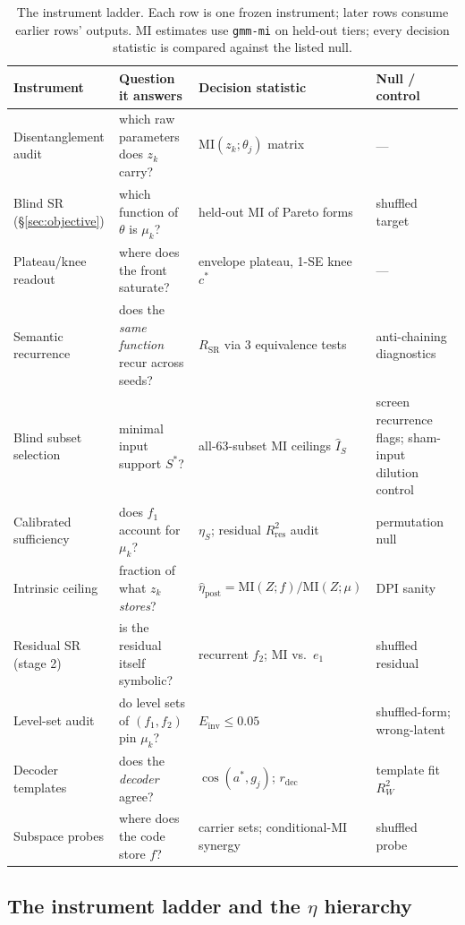 \documentclass[twocolumn,10pt]{article}
\newcommand{\etaS}{\eta_S}
\newcommand{\etapost}{\hat\eta_\mathrm{post}}
\newcommand{\Einv}{E_\mathrm{inv}}
\newcommand{\RSR}{R_\mathrm{SR}}
\newcommand{\MI}{\mathrm{MI}}
\begin{document}
\begin{table}[t]
\centering\small
\caption{The instrument ladder. Each row is one frozen instrument; later rows
consume earlier rows' outputs. MI estimates use \texttt{gmm-mi} on held-out
tiers; every decision statistic is compared against the listed null.}
\label{tab:ladder}
\begin{tabular}{@{}p{3.4cm}p{4.7cm}p{4.6cm}p{3.4cm}@{}}
\toprule
Instrument & Question it answers & Decision statistic & Null / control \\
\midrule
Disentanglement audit & which raw parameters does $z_k$ carry? & $\MI(z_k;\theta_j)$ matrix & --- \\
Blind SR (\S\ref{sec:objective}) & which function of $\theta$ is $\mu_k$? & held-out MI of Pareto forms & shuffled target \\
Plateau/knee readout & where does the front saturate? & envelope plateau, 1-SE knee $c^*$ & --- \\
Semantic recurrence & does the \emph{same function} recur across seeds? & $\RSR$ via 3 equivalence tests & anti-chaining diagnostics \\
Blind subset selection & minimal input support $S^*$? & all-63-subset MI ceilings $\hat I_S$ & screen recurrence flags; sham-input dilution control \\
Calibrated sufficiency & does $f_1$ account for $\mu_k$? & $\etaS$; residual $R^2_\mathrm{res}$ audit & permutation null \\
Intrinsic ceiling & fraction of what $z_k$ \emph{stores}? & $\etapost=\MI(Z;f)/\MI(Z;\mu)$ & DPI sanity \\
Residual SR (stage 2) & is the residual itself symbolic? & recurrent $f_2$; MI vs.\ $e_1$ & shuffled residual \\
Level-set audit & do level sets of $(f_1,f_2)$ pin $\mu_k$? & $\Einv\le0.05$ & shuffled-form; wrong-latent \\
Decoder templates & does the \emph{decoder} agree? & $\cos(a^*,g_j)$; $r_\mathrm{dec}$ & template fit $R^2_W$ \\
Subspace probes & where does the code store $f$? & carrier sets; conditional-MI synergy & shuffled probe \\
\bottomrule
\end{tabular}
\end{table}

\subsection{The instrument ladder and the $\eta$ hierarchy}
\label{sec:ladder}
\end{document}
